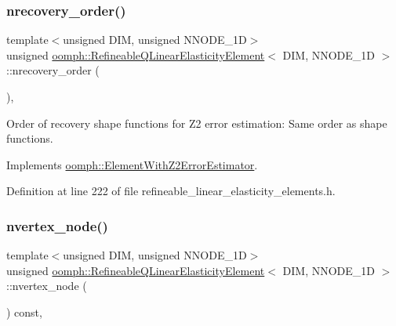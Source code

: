 \subsubsection{\texorpdfstring{nrecovery\+\_\+order()}{nrecovery\_order()}}
{\footnotesize\ttfamily template$<$unsigned D\+IM, unsigned N\+N\+O\+D\+E\+\_\+1D$>$ \\
unsigned \hyperlink{classoomph_1_1RefineableQLinearElasticityElement}{oomph\+::\+Refineable\+Q\+Linear\+Elasticity\+Element}$<$ D\+IM, N\+N\+O\+D\+E\+\_\+1D $>$\+::nrecovery\+\_\+order (\begin{DoxyParamCaption}{ }\end{DoxyParamCaption})\hspace{0.3cm}{\ttfamily [inline]}, {\ttfamily [virtual]}}



Order of recovery shape functions for Z2 error estimation\+: Same order as shape functions. 



Implements \hyperlink{classoomph_1_1ElementWithZ2ErrorEstimator_af39480835bd3e0f6b2f4f7a9a4044798}{oomph\+::\+Element\+With\+Z2\+Error\+Estimator}.



Definition at line 222 of file refineable\+\_\+linear\+\_\+elasticity\+\_\+elements.\+h.

\mbox{\label{classoomph_1_1RefineableQLinearElasticityElement_a9d830361d2e7c275ff4adda026f70c00}} 
\subsubsection{\texorpdfstring{nvertex\+\_\+node()}{nvertex\_node()}}
{\footnotesize\ttfamily template$<$unsigned D\+IM, unsigned N\+N\+O\+D\+E\+\_\+1D$>$ \\
unsigned \hyperlink{classoomph_1_1RefineableQLinearElasticityElement}{oomph\+::\+Refineable\+Q\+Linear\+Elasticity\+Element}$<$ D\+IM, N\+N\+O\+D\+E\+\_\+1D $>$\+::nvertex\+\_\+node (\begin{DoxyParamCaption}{ }\end{DoxyParamCaption}) const\hspace{0.3cm}{\ttfamily [inline]}, {\ttfamily [virtual]}}



